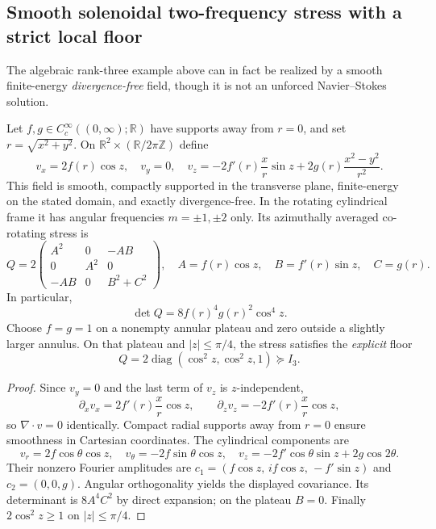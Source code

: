 
\subsection{Smooth solenoidal two-frequency stress with a strict local floor}
\label{subsec:two-frequency-solenoidal-XXIV}
The algebraic rank-three example above can in fact be realized by
a smooth finite-energy \emph{divergence-free} field, though it is not
an unforced Navier--Stokes solution.

\begin{proposition}
\label{prop:two-frequency-solenoidal-XXIV}
Let $f,g\in C_c^\infty((0,\infty);\mathbb R)$ have supports away
from $r=0$, and set $r=\sqrt{x^2+y^2}$.
On $\mathbb R^2\times(\mathbb R/2\pi\mathbb Z)$ define
\[
v_x=2f(r)\cos z,\quad v_y=0,\quad
v_z=-2f'(r)\frac{x}{r}\sin z+
          2g(r)\frac{x^2-y^2}{r^2}.
\]
This field is smooth, compactly supported in the transverse plane,
finite-energy on the stated domain, and exactly divergence-free.
In the rotating cylindrical frame it has angular frequencies
$m=\pm1,\pm2$ only. Its azimuthally averaged co-rotating stress is
\[
Q=2\begin{pmatrix}
 A^2&0&-AB\\0&A^2&0\\-AB&0&B^2+C^2
\end{pmatrix},
\quad A=f(r)\cos z,\quad B=f'(r)\sin z,\quad C=g(r).
\]
In particular,
\[
\boxed{\det Q=8f(r)^4 g(r)^2\cos^4z.}
\]
Choose $f=g=1$ on a nonempty annular plateau and zero outside
a slightly larger annulus. On that plateau and
$|z|\le\pi/4$, the stress satisfies the \emph{explicit} floor
\[
\boxed{Q=2\operatorname{diag}(\cos^2z,\cos^2z,1)
\succeq I_3.}
\]
\end{proposition}
\begin{proof}
Since $v_y=0$ and the last term of $v_z$ is $z$-independent,
\[
\partial_xv_x
=2f'(r)\frac{x}{r}\cos z,\qquad
\partial_zv_z=-2f'(r)\frac{x}{r}\cos z,
\]
so $\nabla\cdot v=0$ identically. Compact radial supports away
from $r=0$ ensure smoothness in Cartesian coordinates.
The cylindrical components are
\[
v_r=2f\cos\theta\cos z,\quad
v_\theta=-2f\sin\theta\cos z,\quad
v_z=-2f'\cos\theta\sin z+2g\cos2\theta .
\]
Their nonzero Fourier amplitudes are
$c_1=(f\cos z,\,if\cos z,\,-f'\sin z)$
and $c_2=(0,0,g)$.
Angular orthogonality yields the displayed covariance.
Its determinant is
$8A^4C^2$ by direct expansion; on the plateau $B=0$.
Finally $2\cos^2z\ge1$ on $|z|\le\pi/4$.
\end{proof}

